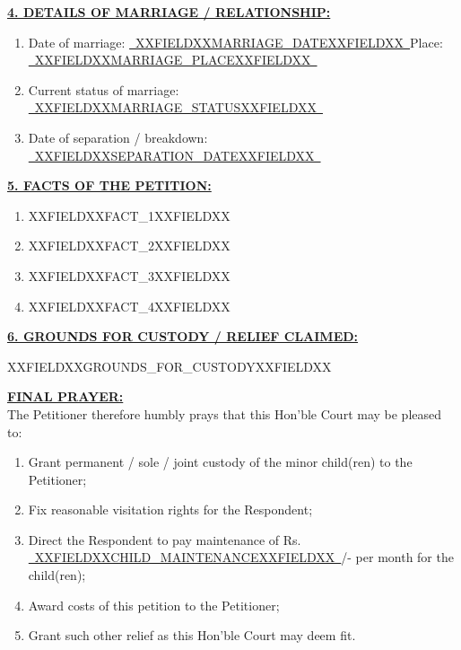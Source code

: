 \documentclass[12pt,a4paper]{article}
\newcommand{\fillline}[1]{\underline{~#1~}}
\begin{document}
\vspace{1em}

\noindent\textbf{\uline{4. DETAILS OF MARRIAGE / RELATIONSHIP:}}
\begin{enumerate}[label=(\alph*), itemsep=0.4em]
    \item Date of marriage: \fillline{XXFIELDXXMARRIAGE_DATEXXFIELDXX}\quad Place: \fillline{XXFIELDXXMARRIAGE_PLACEXXFIELDXX}
    \item Current status of marriage: \fillline{XXFIELDXXMARRIAGE_STATUSXXFIELDXX}
    \item Date of separation / breakdown: \fillline{XXFIELDXXSEPARATION_DATEXXFIELDXX}
\end{enumerate}

\vspace{1em}

\noindent\textbf{\uline{5. FACTS OF THE PETITION:}}

\vspace{0.3em}
\begin{enumerate}[label=(\alph*), itemsep=0.6em]
    \item XXFIELDXXFACT_1XXFIELDXX
    \item XXFIELDXXFACT_2XXFIELDXX
    \item XXFIELDXXFACT_3XXFIELDXX
    \item XXFIELDXXFACT_4XXFIELDXX
\end{enumerate}

\vspace{1em}

\noindent\textbf{\uline{6. GROUNDS FOR CUSTODY / RELIEF CLAIMED:}}

\vspace{0.3em}
XXFIELDXXGROUNDS_FOR_CUSTODYXXFIELDXX

\vspace{1em}

\noindent\textbf{\uline{FINAL PRAYER:}}\\
The Petitioner therefore humbly prays that this Hon'ble Court may be pleased to:
\begin{enumerate}[label=(\alph*), itemsep=0.3em]
    \item Grant permanent / sole / joint custody of the minor child(ren) to the Petitioner;
    \item Fix reasonable visitation rights for the Respondent;
    \item Direct the Respondent to pay maintenance of Rs. \fillline{XXFIELDXXCHILD_MAINTENANCEXXFIELDXX}/-
          per month for the child(ren);
    \item Award costs of this petition to the Petitioner;
    \item Grant such other relief as this Hon'ble Court may deem fit.
\end{enumerate}
\end{document}

